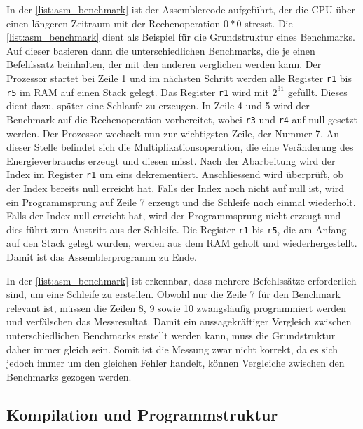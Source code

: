 In der \autoref{list:asm_benchmark} ist der Assemblercode aufgeführt, der die CPU über einen längeren Zeitraum mit der Rechenoperation $0*0$ stresst. Die \autoref{list:asm_benchmark} dient als Beispiel für die Grundstruktur eines Benchmarks. Auf dieser basieren dann die unterschiedlichen Benchmarks, die je einen Befehlssatz beinhalten, der mit den anderen verglichen werden kann. Der Prozessor startet bei Zeile 1 und im nächsten Schritt werden alle Register \texttt{r1} bis \texttt{r5} im RAM auf einen Stack gelegt. Das Register \texttt{r1} wird mit $2^{31}$ gefüllt. Dieses dient dazu, später eine Schlaufe zu erzeugen. In Zeile 4 und 5 wird der Benchmark auf die Rechenoperation vorbereitet, wobei \texttt{r3} und \texttt{r4} auf null gesetzt werden. Der Prozessor wechselt nun zur wichtigsten Zeile, der Nummer 7. An dieser Stelle befindet sich die Multiplikationsoperation, die eine Veränderung des Energieverbrauchs erzeugt und diesen misst. Nach der Abarbeitung wird der Index im Register \texttt{r1} um eins dekrementiert. Anschliessend wird überprüft, ob der Index bereits null erreicht hat. Falls der Index noch nicht auf null ist, wird ein Programmsprung auf Zeile 7 erzeugt und die Schleife noch einmal wiederholt. Falls der Index null erreicht hat, wird der Programmsprung nicht erzeugt und dies führt zum Austritt aus der Schleife. Die Register \texttt{r1} bis \texttt{r5}, die am Anfang auf den Stack gelegt wurden, werden aus dem RAM geholt und wiederhergestellt. Damit ist das Assemblerprogramm zu Ende.
\par
In der \autoref{list:asm_benchmark} ist erkennbar, dass mehrere Befehlssätze erforderlich sind, um eine Schleife zu erstellen. Obwohl nur die Zeile 7 für den Benchmark relevant ist, müssen die Zeilen 8, 9 sowie 10 zwangsläufig programmiert werden und verfälschen das Messresultat. Damit ein aussagekräftiger Vergleich zwischen unterschiedlichen Benchmarks erstellt werden kann, muss die Grundstruktur daher immer gleich sein. Somit ist die Messung zwar nicht korrekt, da es sich jedoch immer um den gleichen Fehler handelt, können Vergleiche zwischen den Benchmarks gezogen werden.


\subsection{Kompilation und Programmstruktur}

